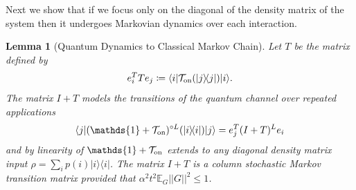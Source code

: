 \documentclass[
 amsmath,amssymb,
 aps,
onecolumn, 
nofootinbib]{revtex4-2}
\newtheorem{lemma}[theorem]{Lemma}
\newcommand{\on}{\rm on}
\newcommand{\ket}[1]{|#1\rangle}
\newcommand{\bra}[1]{\langle #1|}
\newcommand{\ketbra}[2]{| #1\rangle\! \langle #2|}
\newcommand{\norm}[1]{\left|\left| #1 \right|\right|}
\newcommand{\EE}{\mathbb{E}}
\newcommand{\identity}{\mathds{1}}
\begin{document}
Next we show that if we focus only on the diagonal of the density matrix of the system then it undergoes Markovian dynamics over each interaction. 

\begin{lemma}[Quantum Dynamics to Classical Markov Chain] \label{lem:quantum_to_classical}
    Let $T$ be the matrix defined by 
    \begin{equation}
        e_i^T T e_j \coloneqq \bra{i} \mathcal{T}_{\on}(\ketbra{j}{j}) \ket{i}.
    \end{equation}
    The matrix $I + T$ models the transitions of the quantum channel over repeated applications 
    \begin{equation}
        \bra{j} (\identity + \mathcal{T}_{\on})^{\circ L} (\ketbra{i}{i}) \ket{j} = e_j^T (I + T)^L e_i
    \end{equation}
    and by linearity of $\identity + \mathcal{T}_{\on}$ extends to any diagonal density matrix input $\rho = \sum_i p(i) \ketbra{i}{i}$. The matrix $I + T$ is a column stochastic Markov transition matrix provided that $\alpha^2 t^2 \EE_G \norm{G}^2 \le 1$.
\end{lemma}
\end{document}
